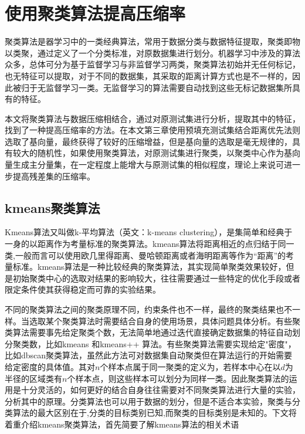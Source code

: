 
\chapter{使用聚类算法提高压缩率}

聚类算法是器学习中的一类经典算法，常用于数据分类与数据特征提取，聚类即物以类聚，通过定义了一个分类标准，对原数据集进行划分。机器学习中涉及的算法众多，总体可分为基于监督学习与非监督学习两类，聚类算法初始并无任何标记，也无特征可以提取，对于不同的数据集，其采取的距离计算方式也是不一样的，因此被归于无监督学习一类。无监督学习的算法需要自动找到这些无标记数据集所具有的特征。

本文将聚类算法与数据压缩相结合，通过对原测试集进行分析，提取其中的特征，找到了一种提高压缩率的方法。在本文第三章使用预填充测试集结合距离优先法则选取了基向量，最终获得了较好的压缩增益，但是基向量的选取是毫无规律的，具有较大的随机性，如果使用聚类算法，对原测试集进行聚类，以聚类中心作为基向量生成主分量集，在一定程度上能增大与原测试集的相似程度，理论上来说可进一步提高残差集的压缩率。

\section{kmeans聚类算法}

Kmeans算法又叫做k-平均算法（英文：k-means clustering），是集简单和经典于一身的以距离作为考量标准的聚类算法。kmeans算法将距离相近的点归结于同一类,一般而言可以使用欧几里得距离、曼哈顿距离或者海明距离等作为“距离”的考量标准。kmeans算法是一种比较经典的聚类算法，其实现简单聚类效果较好，但是初始聚类中心的选取对结果的影响较大，往往需要通过一些特定的优化手段或者限定条件使其获得稳定而可靠的实验结果。

不同的聚类算法之间的聚类原理不同，约束条件也不一样，最终的聚类结果也不一样。当选取某个聚类算法时需要结合自身的使用场景，具体问题具体分析。有些聚类算法需要事先给定聚类个数，无法简单地通过迭代直接确定数据集的特征自动划分聚类数，比如kmeans 和kmeans++ 算法。有些聚类算法需要实现给定"密度"，比如dbscan聚类算法，虽然此方法可对数据集自动聚类但在算法运行的开始需要给定密度的具体值。其对$n$个样本点属于同一聚类的定义为，若样本中心在以$d$为半径的区域类有$n$个样本点，则这些样本可以划分为同样一类。因此聚类算法的运用是十分灵活的，如何更好的结合自身往往需要对不同聚类算法进行大量的实验，分析其中的原理。分类算法也可以用于数据的划分，但是不适合本实验，聚类与分类算法的最大区别在于,分类的目标类别已知,而聚类的目标类别是未知的。下文将着重介绍kmeans聚类算法，首先简要了解kmeans算法的相关术语

